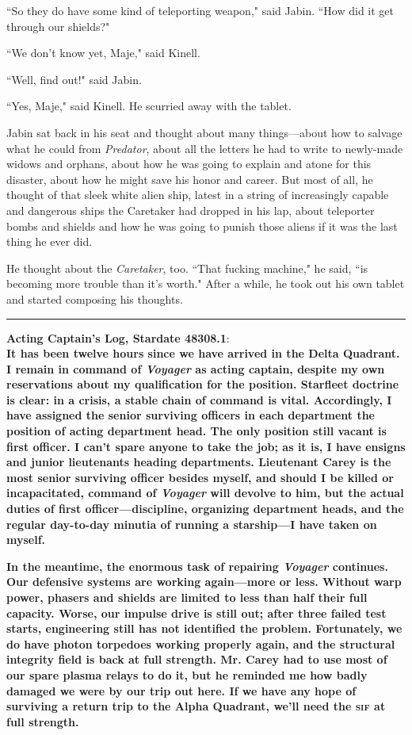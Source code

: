 \documentclass[twoside,letterpaper,12pt]{memoir}
\begin{document}
``So they do have some kind of teleporting weapon," said Jabin. ``How did it get through our shields?"

``We don't know yet, Maje," said Kinell.

``Well, find out!" said Jabin.

``Yes, Maje," said Kinell. He scurried away with the tablet.

Jabin sat back in his seat and thought about many things---about how to salvage what he could from \textit{Predator}, about all the letters he had to write to newly-made widows and orphans, about how he was going to explain and atone for this disaster, about how he might save his honor and career. But most of all, he thought of that sleek white alien ship, latest in a string of increasingly capable and dangerous ships the Caretaker had dropped in his lap, about teleporter bombs and shields and how he was going to punish those aliens if it was the last thing he ever did.

He thought about the \textit{Caretaker}, too. ``That fucking machine," he said, ``is becoming more trouble than it's worth." After a while, he took out his own tablet and started composing his thoughts.

\fancybreak{\rule{3cm}{0.4 pt}}
\noindent\textbf{Acting Captain's Log, Stardate 48308.1}:\\

\textbf{It has been twelve hours since we have arrived in the Delta Quadrant. I remain in command of \textit{Voyager} as acting captain, despite my own reservations about my qualification for the position. Starfleet doctrine is clear: in a crisis, a stable chain of command is vital. Accordingly, I have assigned the senior surviving officers in each department the position of acting department head. The only position still vacant is first officer. I can't spare anyone to take the job; as it is, I have ensigns and junior lieutenants heading departments. Lieutenant Carey is the most senior surviving officer besides myself, and should I be killed or incapacitated, command of \textit{Voyager} will devolve to him, but the actual duties of first officer---discipline, organizing department heads, and the regular day-to-day minutia of running a starship---I have taken on myself.}

\textbf{In the meantime, the enormous task of repairing \textit{Voyager} continues. Our defensive systems are working again---more or less. Without warp power, phasers and shields are limited to less than half their full capacity. Worse, our impulse drive is still out; after three failed test starts, engineering still has not identified the problem. Fortunately, we do have photon torpedoes working properly again, and the structural integrity field is back at full strength. Mr. Carey had to use most of our spare plasma relays to do it, but he reminded me how badly damaged we were by our trip out here. If we have any hope of surviving a return trip to the Alpha Quadrant, we'll need the \textsc{sif} at full strength.}
\end{document}
